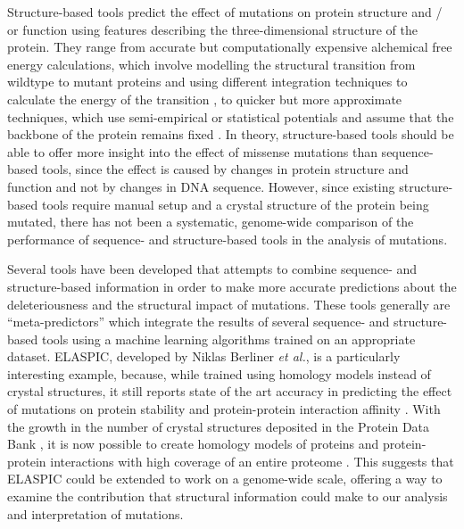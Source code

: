 Structure-based tools predict the effect of mutations on protein structure and / or function using features describing the three-dimensional structure of the protein. They range from accurate but computationally expensive alchemical free energy calculations, which involve modelling the structural transition from wildtype to mutant proteins and using different integration techniques to calculate the energy of the transition \cite{monticelli_introduction_2013}, to quicker but more approximate techniques, which use semi-empirical or statistical potentials and assume that the backbone of the protein remains fixed \cite{benedix_predicting_2009,pires_mcsm:_2014,laimer_maestro_2015,petukh_predicting_2015}. In theory, structure-based tools should be able to offer more insight into the effect of missense mutations than sequence-based tools, since the effect is caused by changes in protein structure and function and not by changes in DNA sequence. However, since existing structure-based tools require manual setup and a crystal structure of the protein being mutated, there has not been a systematic, genome-wide comparison of the performance of sequence- and structure-based tools in the analysis of mutations.

Several tools have been developed that attempts to combine sequence- and structure-based information in order to make more accurate predictions about the deleteriousness \cite{baugh_robust_2016} and the structural impact \cite{dehouck_fast_2009,berliner_combining_2014,li_mutabind_2016} of mutations. These tools generally are ``meta-predictors'' which integrate the results of several sequence- and structure-based tools using a machine learning algorithms trained on an appropriate dataset. ELASPIC, developed by Niklas Berliner \textit{et al.}, is a particularly interesting example, because, while trained using homology models instead of crystal structures, it still reports state of the art accuracy in predicting the effect of mutations on protein stability and protein-protein interaction affinity \cite{berliner_combining_2014}. With the growth in the number of crystal structures deposited in the Protein Data Bank \cite{berman_protein_2000}, it is now possible to create homology models of proteins and protein-protein interactions with high coverage of an entire proteome \cite{mosca_interactome3d:_2013}. This suggests that ELASPIC could be extended to work on a genome-wide scale, offering a way to examine the contribution that structural information could make to our analysis and interpretation of mutations.

